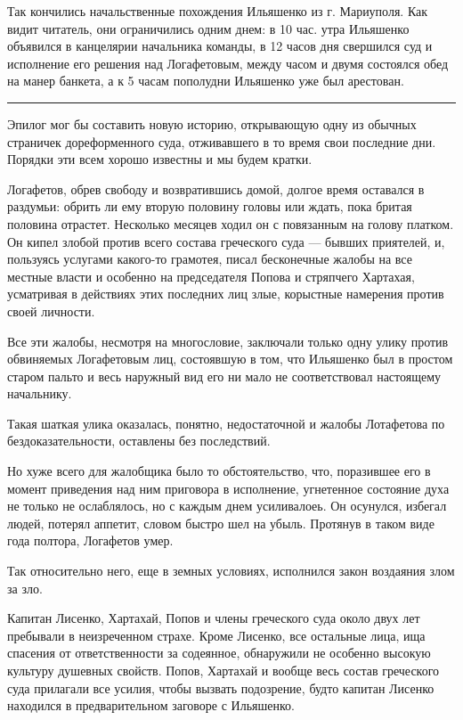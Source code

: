 \documentclass[a4paper,20pt]{article}
\begin{document}
Так кончились начальственные похождения Ильяшенко из г. Мариуполя. Как видит читатель, они
ограничились одним днем: в 10 час. утра Ильяшенко объявился в канцелярии начальника команды, в 12 часов дня
свершился суд и исполнение его решения над Логафетовым, между часом и двумя состоялся обед на манер банкета, а к 
5 часам пополудни Ильяшенко уже был арестован.

\par\noindent\rule{\textwidth}{0.4pt}

Эпилог мог бы составить новую историю, открывающую одну из обычных страничек дореформенного суда,
отживавшего в то время свои последние дни. Порядки эти всем хорошо известны и мы будем кратки.

Логафетов, обрев свободу и возвратившись домой, долгое время оставался в
раздумьи: обрить ли ему вторую половину головы или ждать, пока бритая половина
отрастет.  Несколько месяцев ходил он с повязанным на голову платком. Он кипел
злобой против всего состава греческого суда — бывших приятелей, и, пользуясь
услугами какого-то грамотея, писал бесконечные жалобы на все местные власти и
особенно на председателя Попова и стряпчего Хартахая, усматривая в действиях
этих последних лиц злые, корыстные намерения против своей личности.

Все эти жалобы, несмотря на многословие, заключали только одну улику против обвиняемых
Логафетовым лиц, состоявшую в том, что Ильяшенко был в простом
старом пальто и весь наружный вид его ни мало не соответствовал настоящему начальнику.

Такая шаткая улика оказалась, понятно, недостаточной
и жалобы Лотафетова по бездоказательности, оставлены без
последствий.

Но хуже всего для жалобщика было то обстоятельство, что, поразившее его в
момент приведения над ним приговора в исполнение, угнетенное состояние духа не
только не ослаблялось, но с каждым днем усиливалоеь. Он осунулся, избегал
людей, потерял аппетит, словом быстро шел на убыль. Протянув в таком виде года
полтора, Логафетов умер.

Так относительно него, еще в земных условиях,
исполнился закон воздаяния злом за зло.

Капитан Лисенко, Хартахай, Попов и члены греческого суда 
около двух лет пребывали в неизреченном страхе. Кроме Лисенко, все остальные лица, ища спасения
от ответственности за содеянное, обнаружили не особенно
высокую культуру душевных свойств. Попов, Хартахай
и вообще весь состав греческого суда прилагали все усилия, 
чтобы вызвать подозрение, будто капитан Лисенко находился 
в предварительном заговоре с Ильяшенко.
\end{document}
